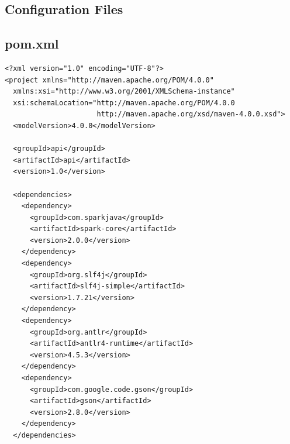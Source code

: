 \documentclass{l4proj}
\begin{document}
\begin{appendices}
\chapter{Configuration Files}
\section{pom.xml}
\label{sec:pom.xml}
\begin{lstlisting}[language=config]
<?xml version="1.0" encoding="UTF-8"?>
<project xmlns="http://maven.apache.org/POM/4.0.0"
  xmlns:xsi="http://www.w3.org/2001/XMLSchema-instance"
  xsi:schemaLocation="http://maven.apache.org/POM/4.0.0
                      http://maven.apache.org/xsd/maven-4.0.0.xsd">
  <modelVersion>4.0.0</modelVersion>

  <groupId>api</groupId>
  <artifactId>api</artifactId>
  <version>1.0</version>

  <dependencies>
    <dependency>
      <groupId>com.sparkjava</groupId>
      <artifactId>spark-core</artifactId>
      <version>2.0.0</version>
    </dependency>
    <dependency>
      <groupId>org.slf4j</groupId>
      <artifactId>slf4j-simple</artifactId>
      <version>1.7.21</version>
    </dependency>
    <dependency>
      <groupId>org.antlr</groupId>
      <artifactId>antlr4-runtime</artifactId>
      <version>4.5.3</version>
    </dependency>
    <dependency>
      <groupId>com.google.code.gson</groupId>
      <artifactId>gson</artifactId>
      <version>2.8.0</version>
    </dependency>
  </dependencies>


\end{lstlisting}
\end{appendices}
\end{document}
